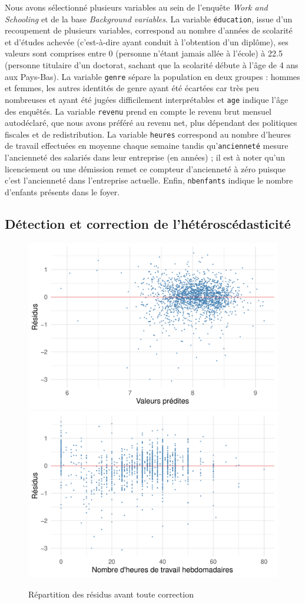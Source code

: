 \documentclass[a4paper, french, 11 pt]{article}\usepackage[]{graphicx}\usepackage[]{xcolor}
\begin{document}
Nous avons sélectionné plusieurs variables au sein de l’enquête \textit{Work and Schooling} et de la base \textit{Background variables}. La variable \verb+éducation+, issue d’un recoupement de plusieurs variables, correspond au nombre d’années de scolarité et d’études achevée (c’est-à-dire ayant conduit à l’obtention d’un diplôme), ses valeurs sont comprises entre 0 (personne n’étant jamais allée à l’école) à 22.5 (personne titulaire d’un doctorat, sachant que la scolarité débute à l’âge de 4 ans aux Pays-Bas). La variable \verb+genre+ sépare la population en deux groupes : hommes et femmes, les autres identités de genre ayant été écartées car très peu nombreuses et ayant été jugées difficilement interprétables et \verb+age+ indique l’âge des enquêtés. La variable \verb+revenu+ prend en compte le revenu brut mensuel autodéclaré, que nous avons préféré au revenu net, plus dépendant des politiques fiscales et de redistribution. La variable \verb+heures+ correspond au nombre d’heures de travail effectuées en moyenne chaque semaine tandis qu’\verb+ancienneté+ mesure l’ancienneté des salariés dans leur entreprise (en années) ; il est à noter qu’un licenciement ou une démission remet ce compteur d’ancienneté à zéro puisque c’est l’ancienneté dans l’entreprise actuelle. Enfin, \verb+nbenfants+ indique le nombre d’enfants présents dans le foyer. 

\subsection{Détection et correction de l’hétéroscédasticité}



\begin{figure}[h]
\center
\includegraphics[width=0.49\linewidth]{figure/plot_hetero_fitted.pdf}
\includegraphics[width=0.49\linewidth]{figure/plot_hetero_heures.pdf}
\caption{Répartition des résidus avant toute correction\label{fig:hetero}}
\end{figure}
\end{document}
